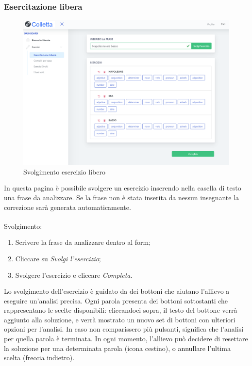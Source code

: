         \subsubsection{Esercitazione libera}      
        	\begin{figure}[H]
                \centering
                \includegraphics[width=17cm]{sez/img/studente/esercitazioneLiberaEsegui.PNG} 
                \caption{Svolgimento esercizio libero}\label{fig:1}
        	\end{figure}
          In questa pagina è possibile svolgere un esercizio inserendo nella casella di testo una frase da analizzare.
          Se la frase non è stata inserita da nessun insegnante la correzione sarà generata automaticamente.\\
        \\ Svolgimento:
        	\begin{enumerate}        
            	\item Scrivere la frase da analizzare dentro al form;
            	\item Cliccare su \textit{Svolgi l'esercizio};
            	\item Svolgere l'esercizio e cliccare \textit{Completa}.
        	\end{enumerate}
        	\label{sec:esLib}
        	Lo svolgimento dell'esercizio è guidato da dei bottoni che aiutano l'allievo a eseguire un'analisi precisa. Ogni parola presenta dei bottoni sottostanti che rappresentano le scelte disponibili: cliccandoci sopra, il testo del bottone verrà aggiunto alla soluzione, e verrà mostrato un nuovo set di bottoni con ulteriori opzioni per l'analisi. In caso non comparissero più pulsanti, significa che l'analisi per quella parola è terminata. In ogni momento, l'allievo può decidere di resettare la soluzione per una determinata parola (icona cestino), o annullare l'ultima scelta (freccia indietro).

